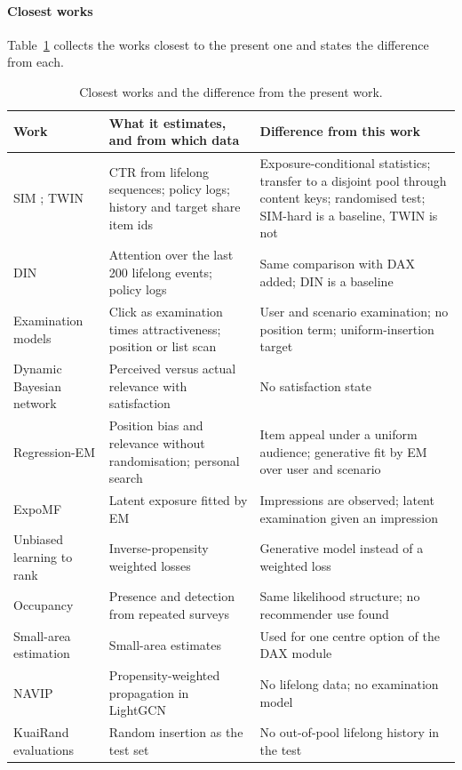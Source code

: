 \paragraph{Closest works} Table~\ref{tab:positioning} collects the works closest to the present one and states the difference from each.

\begin{table}[tbp]
\caption{Closest works and the difference from the present work.}
\label{tab:positioning}
\centering
\footnotesize
\raggedright
\begin{tabular}{p{3.4cm}p{4.2cm}p{5.4cm}}
\toprule
Work & What it estimates, and from which data & Difference from this work \\
\midrule
SIM \citep{pi2020sim}; TWIN \citep{chang2023twin} & CTR from lifelong sequences; policy logs; history and target share item ids & Exposure-conditional statistics; transfer to a disjoint pool through content keys; randomised test; SIM-hard is a baseline, TWIN is not \\
DIN \citep{zhou2018din} & Attention over the last 200 lifelong events; policy logs & Same comparison with DAX added; DIN is a baseline \\
Examination models \citep{richardson2007predicting,craswell2008cascade,chuklin2015clickmodels} & Click as examination times attractiveness; position or list scan & User and scenario examination; no position term; uniform-insertion target \\
Dynamic Bayesian network \citep{chapelle2009dbn} & Perceived versus actual relevance with satisfaction & No satisfaction state \\
Regression-EM \citep{wang2018regressionem,wang2016selection} & Position bias and relevance without randomisation; personal search & Item appeal under a uniform audience; generative fit by EM over user and scenario \\
ExpoMF \citep{liang2016exposure} & Latent exposure fitted by EM & Impressions are observed; latent examination given an impression \\
Unbiased learning to rank \citep{joachims2017unbiased} & Inverse-propensity weighted losses & Generative model instead of a weighted loss \\
Occupancy \citep{mackenzie2002occupancy} & Presence and detection from repeated surveys & Same likelihood structure; no recommender use found \\
Small-area estimation \citep{fay1979smallarea} & Small-area estimates & Used for one centre option of the DAX module \\
NAVIP \citep{kim2022navip} & Propensity-weighted propagation in LightGCN & No lifelong data; no examination model \\
KuaiRand evaluations \citep{gao2022kuairand,zhang2026categorymeans} & Random insertion as the test set & No out-of-pool lifelong history in the test \\
\bottomrule
\end{tabular}
\end{table}
